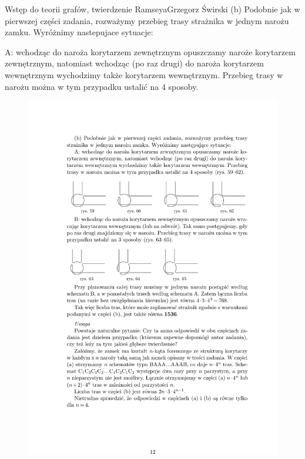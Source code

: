 \begin{referat}{Wstęp do teorii grafów, twierdzenie Ramseya}{Grzegorz Świrski}
(b) Podobnie jak w pierwszej części zadania, rozważymy przebieg trasy
strażnika w jednym narożu zamku. Wyróżnimy nastepujace sytuacje:

A: wchodząc do naroża korytarzem zewnętrznym opuszczamy naroże korytarzem
zewnętrznym, natomiast wchodząc (po raz drugi) do naroża korytarzem
wewnętrznym wychodzimy także korytarzem wewnętrznym. Przebieg
trasy w narożu można w tym przypadku ustalić na 4 sposoby.
\begin{figure}[!h]
  \begin{flushright}
  \includegraphics[scale=1]{./swirski/ex6e.pdf}
  \end{flushright}
\end{figure}


\end{referat}
